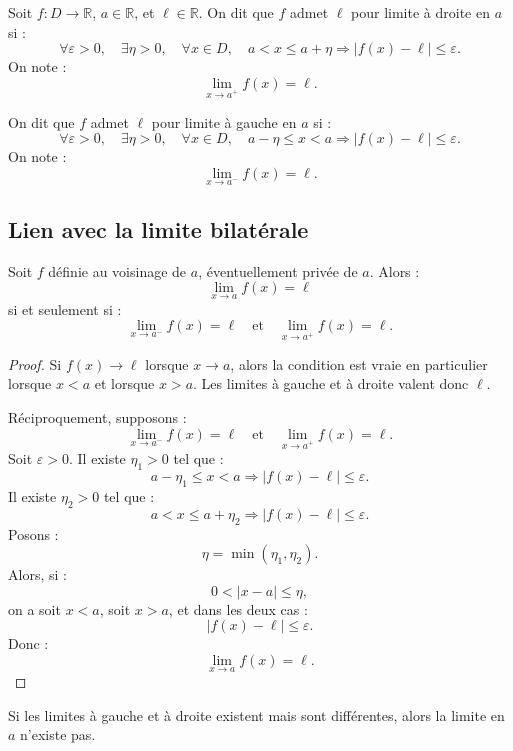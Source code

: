 \documentclass[11pt,a4paper]{article}
\newcommand{\R}{\mathbb R}
\newcommand{\implique}{\Longrightarrow}
\begin{document}
\begin{definitionbox}
Soit \(f:D\to\R\), \(a\in\R\), et \(\ell\in\R\).  
On dit que \(f\) admet \(\ell\) pour limite à droite en \(a\) si :
\[
\forall \varepsilon>0,\quad \exists \eta>0,\quad \forall x\in D,\quad
a<x\leq a+\eta \implique |f(x)-\ell|\leq\varepsilon.
\]
On note :
\[
\lim_{x\to a^+}f(x)=\ell.
\]
\end{definitionbox}

\begin{definitionbox}
On dit que \(f\) admet \(\ell\) pour limite à gauche en \(a\) si :
\[
\forall \varepsilon>0,\quad \exists \eta>0,\quad \forall x\in D,\quad
a-\eta\leq x<a \implique |f(x)-\ell|\leq\varepsilon.
\]
On note :
\[
\lim_{x\to a^-}f(x)=\ell.
\]
\end{definitionbox}

\subsection{Lien avec la limite bilatérale}

\begin{theorembox}
Soit \(f\) définie au voisinage de \(a\), éventuellement privée de \(a\).  
Alors :
\[
\lim_{x\to a}f(x)=\ell
\]
si et seulement si :
\[
\lim_{x\to a^-}f(x)=\ell
\quad\text{et}\quad
\lim_{x\to a^+}f(x)=\ell.
\]
\end{theorembox}

\begin{proof}
Si \(f(x)\to\ell\) lorsque \(x\to a\), alors la condition est vraie en particulier lorsque \(x<a\) et lorsque \(x>a\).  
Les limites à gauche et à droite valent donc \(\ell\).

Réciproquement, supposons :
\[
\lim_{x\to a^-}f(x)=\ell
\quad\text{et}\quad
\lim_{x\to a^+}f(x)=\ell.
\]
Soit \(\varepsilon>0\).  
Il existe \(\eta_1>0\) tel que :
\[
a-\eta_1\leq x<a\implique |f(x)-\ell|\leq\varepsilon.
\]
Il existe \(\eta_2>0\) tel que :
\[
a<x\leq a+\eta_2\implique |f(x)-\ell|\leq\varepsilon.
\]
Posons :
\[
\eta=\min(\eta_1,\eta_2).
\]
Alors, si :
\[
0<|x-a|\leq\eta,
\]
on a soit \(x<a\), soit \(x>a\), et dans les deux cas :
\[
|f(x)-\ell|\leq\varepsilon.
\]
Donc :
\[
\lim_{x\to a}f(x)=\ell.
\]
\end{proof}

\begin{erreurbox}
Si les limites à gauche et à droite existent mais sont différentes, alors la limite en \(a\) n'existe pas.
\end{erreurbox}
\end{document}
